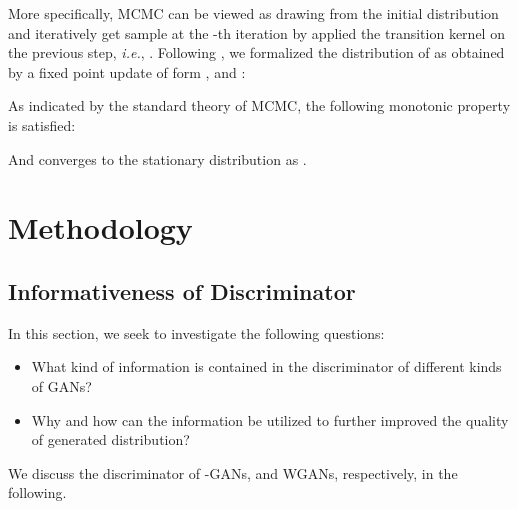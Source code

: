 \documentclass{article}
\begin{document}
More specifically, MCMC can be viewed as drawing  from the initial distribution  and iteratively get sample  at the -th iteration by applied the transition kernel on the previous step, \emph{i.e.}, . Following \cite{li2017approximate}, we formalized the distribution  of  as obtained by a fixed point update of form , and :

As indicated by the standard theory of MCMC, the following monotonic property is satisfied:

And  converges to the stationary distribution  as .

\section{Methodology}
\label{sec:methodology}
\subsection{Informativeness of Discriminator}\label{sec::iod}
In this section, we seek to investigate the following questions:
\begin{itemize}
\vspace{-3pt}
    \item What kind of information is contained in the discriminator of different kinds of GANs?
    \vspace{-1pt}
    \item Why and how can the information be utilized to further improved the quality of generated distribution?
\vspace{-3pt}
\end{itemize}
We discuss the discriminator of -GANs, and WGANs, respectively, in the following.
\end{document}
